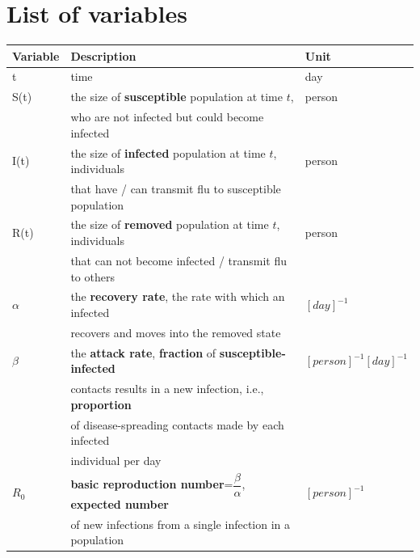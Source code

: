 \documentclass[11pt, a4paper, twoside]{report}
\begin{document}

\newpage
\tableofcontents %


\chapter*{List of variables}

\begin{table}[H]

\begin{tabular}{| l | l | l |}

\hline
Variable &  Description & Unit \\ \hline
t & time & day \\ \hline
S(t) & the size of \textbf{susceptible} population at time $t$,  & person \\   
      & who are not infected but could become infected &  \\ \hline
I(t) & the size of \textbf{infected} population at time $t$, individuals  & person \\       & that have / can transmit flu to susceptible population & \\ \hline
R(t) & the size of \textbf{removed} population at time $t$, individuals  & person \\
     & that can not become infected / transmit flu to others &  \\ \hline
$\alpha$ & the \textbf{recovery rate}, the rate with which an infected & $[day]^{-1}$ \\
     & recovers and moves into the removed state &   \\ \hline
$\beta$ & the \textbf{attack rate}, \textbf{fraction} of \textbf{susceptible-infected} & $[person]^{-1}[day]^{-1}$ \\ 
     & contacts results in a new infection, i.e., \textbf{proportion} & \\  
     & of disease-spreading contacts made by each infected &  \\ 
     & individual per day & \\ \hline
$R_0$ & \textbf{basic reproduction number}=$\dfrac{\beta}{\alpha}$, \textbf{expected number}  & $[person]^{-1}$ \\
      & of new infections from a single infection in a population & \\
\hline
\end{tabular}

\end{table}
\end{document}
